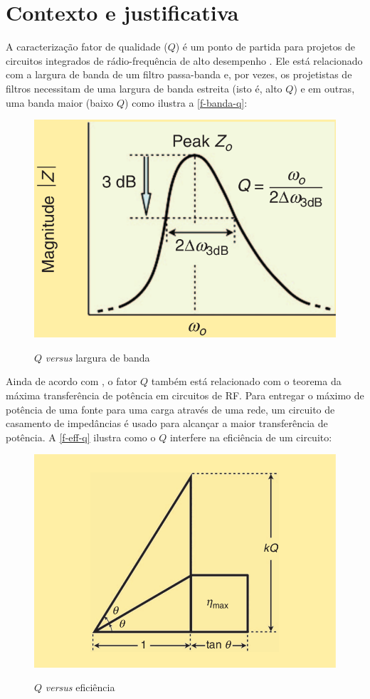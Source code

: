 \section{Contexto e justificativa}

A caracterização fator de qualidade ($Q$) é um ponto de partida para projetos de circuitos integrados de rádio-frequência de alto desempenho \cite{what-is-q-takashi}. Ele está relacionado com a largura de banda de um filtro passa-banda e, por vezes, os projetistas de filtros necessitam de uma largura de banda estreita (isto é, alto $Q$) e em outras, uma banda maior (baixo $Q$) como ilustra a \autoref{f-banda-q}:

\begin{figure}[H]
    \centering
    \caption{$Q$ \textit{versus} largura de banda}
    \includegraphics[width=.5\textwidth]{fig/q-band.png}
    \label{f-banda-q}
\end{figure}



Ainda de acordo com \citeauthor{what-is-q-takashi}, o fator $Q$ também está relacionado com o teorema da máxima transferência de potência em circuitos de RF. Para entregar o máximo de potência de uma fonte para uma carga através de uma rede, um circuito de casamento de impedâncias é usado para alcançar a maior transferência de potência. A \autoref{f-eff-q} ilustra como o $Q$ interfere na eficiência de um circuito:


\begin{figure}[H]
    \centering
    \caption{$Q$ \textit{versus} eficiência}
    \includegraphics[width=.5\textwidth]{fig/q-eff.png}
    \label{f-eff-q}
\end{figure}


